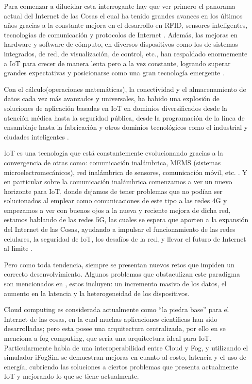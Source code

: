 \vskip 0.8cm
Para comenzar a dilucidar esta interrogante hay que ver primero el panorama actual del Internet de las Cosas el cual ha tenido grandes avances en los últimos años gracias a la constante mejora en el desarrollo en RFID, sensores inteligentes, tecnologías de comunicación y protocolos de Internet \citep{alfuqaha2015,borgia2014}. Además, las mejoras en hardware y software de cómputo, en diversos dispositivos como los de sistemas integrados, de red, de visualización, de control, etc., han respaldado enormemente a IoT para crecer de manera lenta pero a la vez constante, logrando superar grandes expectativas y posicionarse como una gran tecnología emergente \citep{vyas2017}.\par
\vskip 0.3cm
Con el cálculo(operaciones matemáticas), la conectividad y el almacenamiento de datos cada vez más avanzados y universales, ha habido una explosión de soluciones de aplicación basadas en IoT en dominios diversificados desde la atención médica hasta la seguridad pública, desde la programación de la línea de ensamblaje hasta la fabricación y otros dominios tecnológicos como el industrial y ciudades inteligentes \citep{borgia2014,vyas2017}.\par
\vskip 0.3cm
IoT es una tecnología que está constantemente evolucionando gracias a la convergencia de otras como: comunicación inalámbrica, MEMS (sistemas microelectromecánicos), red inalámbrica de sensores, comunicación móvil, etc. \citep{vyas2017}. Y en particular sobre la comunicación inalámbrica comenzamos a ver un nuevo horizonte para IoT, donde dejamos de tener problemas que no podían ser solucionados al emplear como comunicaciones de este tipo a las redes 4G y empezamos a ver con buenos ojos a la nueva y reciente mejora de dicha red, estamos hablando de las redes 5G, las cuales se espera que aporten a la expansión del Internet de las Cosas, ayudando a impulsar el funcionamiento de las redes celulares, la seguridad de IoT, los desafíos de la red, y llevar el futuro de Internet al límite \citep{li2018}.\par
\vskip 0.3cm
Pero como toda tendencia, siempre se presentan nuevos retos que impiden un correcto desenvolvimiento. Algunos problemas que obstaculizan este paradigma son mencionados en \citep{borgia2014,ibrahim2015,mahumd2018}, estos incluyen: un incremento masivo de los datos, el aumento en la latencia y la heterogeneidad de los dispositivos.\par
\vskip 0.3cm
Cloud computing \citep{ibrahim2015} es considerada actualmente como “la piedra base” para el Internet de las cosas, en la cual muchas aplicaciones científicas han sido desarrolladas; pero esta posee una arquitectura centralizada, por ello en \citep{mahumd2018,patel2018,yi2015} se menciona a fog computing, que sería una arquitectura ideal para IoT. Particularmente \citep{mahumd2018} habla de una interoperabilidad entre Cloud y Fog, y utilizando el simulador iFogSim se demuestran mejoras en cuanto al costo, latencia y el uso de energía, cubriendo las soluciones a ciertos problemas que presenta actualmente IoT y mejorando lo que se tiene actualmente.\par
